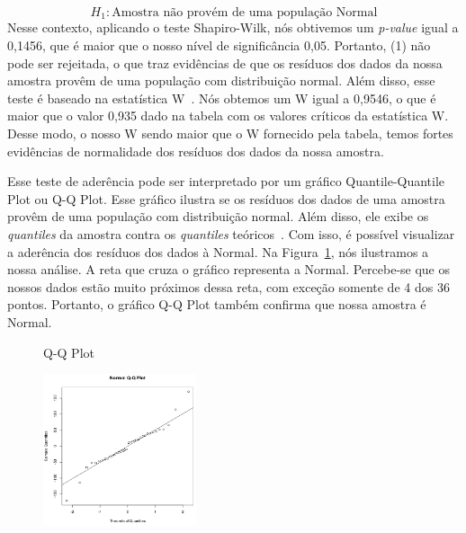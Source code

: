 \begin{equation}
	H_{1} : \text{Amostra não provém de uma população Normal}
\end{equation}
Nesse contexto, aplicando o teste Shapiro-Wilk, nós obtivemos um \emph{p-value} igual a 0,1456, que é maior que o nosso nível de significância 0,05. Portanto, (1) não pode ser rejeitada, o que traz evidências de que os resíduos dos dados da nossa amostra provêm de uma população com distribuição normal. Além disso, esse teste é baseado na estatística W~\cite{estatisticaw}. Nós obtemos um W igual a 0,9546, o que é maior que o valor 0,935 dado na tabela com os valores críticos da estatística W. Desse modo, o nosso W sendo maior que o W fornecido pela tabela, temos fortes evidências de normalidade dos resíduos dos dados da nossa amostra.

Esse teste de aderência pode ser interpretado por um gráfico Quantile-Quantile Plot ou Q-Q Plot. Esse gráfico ilustra se os resíduos dos dados de uma amostra provêm de uma população com distribuição normal. Além disso, ele exibe os \emph{quantiles} da amostra contra os \emph{quantiles} teóricos~\cite{Wilk1968}. Com isso, é possível visualizar a aderência dos resíduos dos dados à Normal. Na Figura~\ref{fig:grafico1}, nós ilustramos a nossa análise. A reta que cruza o gráfico representa a Normal. Percebe-se que os nossos dados estão muito próximos dessa reta, com exceção somente de 4 dos 36 pontos. Portanto, o gráfico Q-Q Plot também confirma que nossa amostra é Normal.


\begin{figure}[t]
	\caption{Q-Q Plot}
    \centering
    \includegraphics[width=0.4\textwidth]{images/qqplot.png}
    \caption{}
    \label{fig:grafico1}
\end{figure}